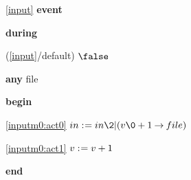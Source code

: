 \noindent \ref{input}  \textbf{event}
\begin{block}
  \item   \textbf{during}
  \begin{block}
  \item[ (\ref{input}/default) ]{$\false$} %
  \end{block}
  \item   \textbf{any} file
  \item   \textbf{begin}
  \begin{block}
  \item[ \eqref{inputm0:act0} ]{$in \bcmeq in \2| (v\0+1 \fun file) $} %
  \item[ \eqref{inputm0:act1} ]{$v \mathrel{:\mkern1mu=} v+1$} %
  \end{block}
  \item   \textbf{end} \\
\end{block}

